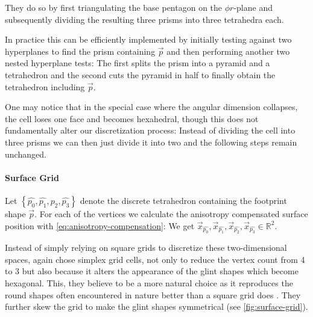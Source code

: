 They do so by first triangulating the base pentagon on the $\phi r$\nobreakdash-plane and subsequently dividing the resulting three prisms into three tetrahedra each.


In practice this can be efficiently implemented by initially testing against two hyperplanes to find the prism containing $\vec{p}$ and then performing another two nested hyperplane tests:
%
The first splits the prism into a pyramid and a tetrahedron and the second cuts the pyramid in half to finally obtain the tetrahedron including $\vec{p}$.


One may notice that in the special case where the angular dimension collapses, the cell loses one face and becomes hexahedral, though this does not fundamentally alter our discretization process:
%
Instead of dividing the cell into three prisms we can then just divide it into two and the following steps remain unchanged.




\paragraph{Surface Grid}
%
Let $\left\{\hat{p_0},\hat{p_1},\hat{p_2},\hat{p_3}\right\}$ denote the discrete tetrahedron containing the footprint shape $\vec{p}$.
%
For each of the vertices we calculate the anisotropy compensated surface position with \cref{eq:anisotropy-compensation}: We get $\vec{x}_{\hat{p_0}}, \vec{x}_{\hat{p_1}}, \vec{x}_{\hat{p_2}}, \vec{x}_{\hat{p_3}} \in \mathbb{R}^2$.



Instead of simply relying on square grids to discretize these two-dimensional spaces, \textcite{deliot2023} again chose simplex grid cells, not only to reduce the vertex count from 4 to 3 but also because it alters the appearance of the glint shapes which become hexagonal.
%
This, they believe to be a more natural choice as it reproduces the round shapes often encountered in nature better than a square grid does \parencite{deliot2023}.
%
They further skew the grid to make the glint shapes symmetrical (see \cref{fig:surface-grid}).

